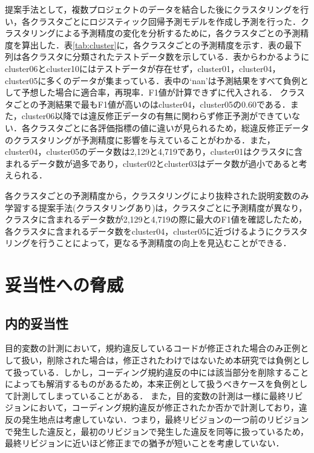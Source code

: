 \documentclass[submit,noauthor,dvipdfmx]{ipsj}
\begin{document}
提案手法として，複数プロジェクトのデータを結合した後にクラスタリングを行い，各クラスタごとにロジスティック回帰予測モデルを作成し予測を行った．クラスタリングによる予測精度の変化を分析するために，各クラスタごとの予測精度を算出した．表\ref{tab:cluster}に，各クラスタごとの予測精度を示す．表の最下列は各クラスタに分類されたテストデータ数を示している．表からわかるようにcluster06とcluster10にはテストデータが存在せず，cluster01，cluster04，cluster05に多くのデータが集まっている．表中の`nan'は予測結果をすべて負例として予想した場合に適合率，再現率．F1値が計算できずに代入される．
クラスタごとの予測結果で最もF1値が高いのはcluster04，cluster05の0.60である．また，cluster06以降では違反修正データの有無に関わらず修正予測ができていない．各クラスタごとに各評価指標の値に違いが見られるため，総違反修正データのクラスタリングが予測精度に影響を与えていることがわかる．また，cluster04，cluster05のデータ数は2,129と4,719であり，cluster01はクラスタに含まれるデータ数が過多であり，cluster02とcluster03はデータ数が過小であると考えられる．

各クラスタごとの予測精度から，クラスタリングにより抜粋された説明変数のみ学習する提案手法(クラスタリングあり)は，クラスタごとに予測精度が異なり，クラスタに含まれるデータ数が2,129と4,719の際に最大のF1値を確認したため，各クラスタに含まれるデータ数をcluster04，cluster05に近づけるようにクラスタリングを行うことによって，更なる予測精度の向上を見込むことができる．


\section{妥当性への脅威}\label{chap:heuristic}
\subsection{内的妥当性}


目的変数の計測において，規約違反しているコードが修正された場合のみ正例として扱い，削除された場合は，修正されたわけではないため本研究では負例として扱っている．しかし，コーディング規約違反の中には該当部分を削除することによっても解消するものがあるため，本来正例として扱うべきケースを負例として計測してしまっていることがある．
また，目的変数の計測は一様に最終リビジョンにおいて，コーディング規約違反が修正されたか否かで計測しており，違反の発生地点は考慮していない．つまり，最終リビジョンの一つ前のリビジョンで発生した違反と，最初のリビジョンで発生した違反を同等に扱っているため，最終リビジョンに近いほど修正までの猶予が短いことを考慮していない．
\end{document}
